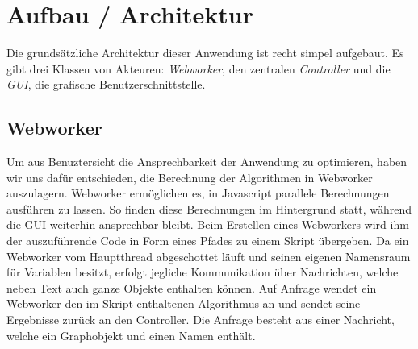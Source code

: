 \documentclass[a4paper,twocolumn]{scrartcl}
\begin{document}
\section{Aufbau / Architektur}
Die grundsätzliche Architektur dieser Anwendung ist recht simpel aufgebaut. Es gibt drei Klassen von Akteuren: \emph{Webworker}, den zentralen \emph{Controller} und die \emph{GUI}, die grafische Benutzerschnittstelle.

\subsection{Webworker}
Um aus Benuztersicht die Ansprechbarkeit der Anwendung zu optimieren, haben wir uns dafür entschieden, die Berechnung der Algorithmen in Webworker auszulagern. Webworker ermöglichen es, in Javascript parallele Berechnungen ausführen zu lassen. So finden diese Berechnungen im Hintergrund statt, während die GUI weiterhin ansprechbar bleibt.
Beim Erstellen eines Webworkers wird ihm der auszuführende Code in Form eines Pfades zu einem Skript übergeben.
Da ein Webworker vom Hauptthread abgeschottet läuft und seinen eigenen Namensraum für Variablen besitzt, erfolgt jegliche Kommunikation über Nachrichten, welche neben Text auch ganze Objekte enthalten können.
Auf Anfrage wendet ein Webworker den im Skript enthaltenen Algorithmus an und sendet seine Ergebnisse zurück an den Controller. Die Anfrage besteht aus einer Nachricht, welche ein Graphobjekt und einen Namen enthält.
\end{document}
